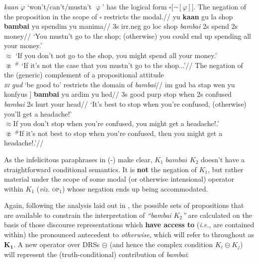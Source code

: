 \a\begingl\glpreamble \textit{kaan} $ \varphi $ `won't/can't/mustn't $ \upvarphi $' has the logical form $ \square\big[\neg[\varphi]\big] $. The negation of the proposition in the scope of $ \square $ restricts the modal.//
 \gla \nogloss{{[$ _\mathit{{K_1}} $}} yu \textbf{kaan} gu la shop  \nogloss{]}  \textbf{bambai} yu spendim yu manima//
\glb 3s \gls{irr}.\gls{neg} go \gls{loc} shop \textsl{bambai} 2s spend 2s money//
\glft `You mustn't go to the shop; (otherwise) you could end up spending all your money.'\trailingcitation{[AJ~23022017]}\\
$ \approx $ `If you don't not go to the shop, you might spend all your money.'\\
$ \not\approx\ ^\#\!{} $ `If it's not the case that you mustn't  go to the shop...'//
\endgl
\a\begingl{}\glpreamble The negation of the (generic) complement of a propositional attitude\\\textit{\textsc{bi} gud} `be good to' restricts the domain of \textit{bambai}//
\gla \nogloss{[$ _\mathit{K_1} $} im gud ba stap wen yu konfyus \nogloss] \textbf{bambai} yu ardim yu hed//
\glb 3s good {\sc purp} stop when 2s confused \textsl {bambai} 2s hurt your head//
\glft`It's best to stop when you're confused, (otherwise) you'll get a headache!'\\
$ \approx $If you don't stop when you're confused, you might get a headache!.'\\
$ \not\approx\ ^\#\!{}$If it's not best to stop when you're confused, then you might get a headache!.'//%
\endgl



\xe




As the infelicitous paraphrases in (-) make clear, $ \mathit{K_1}\textit{ bambai }\mathit{K_2}$ doesn't have a straightforward conditional semantics. It is \textbf{not} the negation of $ \mathit{K_1} $, but rather material under the scope of some modal (or otherwise intensional) operator within $ \mathit{K_1} $ (\textit{viz.} \textsc{op$ _1 $}) whose negation ends up being accommodated.



Again, following the analysis laid out in \citet{PhilKotek}, the possible sets of propositions that are available to constrain the interpretation of \textit{``bambai $ K_2 $''} are calculated on the basis of those discourse representations which \textbf{have access to} (\textit{i.e.}, are contained within) the pronounced antecedent to \textit{otherwise}, which will refer to throughout as $ \boldsymbol{K_1} $.
A new operator over DRSs $ \boldsymbol\circleddash$ (and hence the complex condition $ K_i\circleddash K_j$) will represent the (truth-conditional) contribution of \textit{bambai}:%


